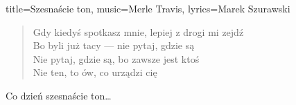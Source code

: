 \begin{song}{title={Szesnaście ton}, music={Merle Travis}, lyrics={Marek Szurawski}}
    \begin{verse}
        Gdy kiedyś spotkasz mnie, lepiej z drogi mi zejdź \\
        Bo byli już tacy --- nie pytaj, gdzie są  \\
        Nie pytaj, gdzie są, bo zawsze jest ktoś \\
        Nie ten, to ów, co urządzi cię
    \end{verse}
    \begin{chorus}
        Co dzień szesnaście ton\ldots
    \end{chorus}
\end{song}

